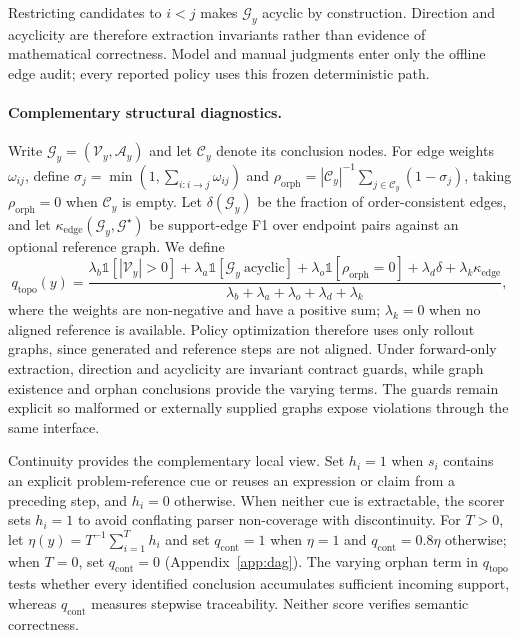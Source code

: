 Restricting candidates to $i<j$ makes $\mathcal{G}_y$ acyclic by construction. Direction and acyclicity are therefore extraction invariants rather than evidence of mathematical correctness. Model and manual judgments enter only the offline edge audit; every reported policy uses this frozen deterministic path.

\paragraph{Complementary structural diagnostics.}
Write $\mathcal{G}_y=(\mathcal{V}_y,\mathcal{A}_y)$ and let $\mathcal{C}_y$ denote its conclusion nodes. For edge weights $\omega_{ij}$, define $\sigma_j=\min(1,\sum_{i:i\to j}\omega_{ij})$ and $\rho_{\mathrm{orph}}=|\mathcal{C}_y|^{-1}\sum_{j\in\mathcal{C}_y}(1-\sigma_j)$, taking $\rho_{\mathrm{orph}}=0$ when $\mathcal{C}_y$ is empty. Let $\delta(\mathcal{G}_y)$ be the fraction of order-consistent edges, and let $\kappa_{\mathrm{edge}}(\mathcal{G}_y,\mathcal{G}^{\star})$ be support-edge F1 over endpoint pairs against an optional reference graph. We define
\begin{equation}
\label{eq:qtopo}
q_{\mathrm{topo}}(y)=
\frac{\lambda_b\mathbb{1}[|\mathcal{V}_y|>0]+\lambda_a\mathbb{1}[\mathcal{G}_y\ \mathrm{acyclic}]+\lambda_o\mathbb{1}[\rho_{\mathrm{orph}}=0]+\lambda_d\delta+\lambda_k\kappa_{\mathrm{edge}}}
{\lambda_b+\lambda_a+\lambda_o+\lambda_d+\lambda_k},
\end{equation}
where the weights are non-negative and have a positive sum; $\lambda_k=0$ when no aligned reference is available. Policy optimization therefore uses only rollout graphs, since generated and reference steps are not aligned. Under forward-only extraction, direction and acyclicity are invariant contract guards, while graph existence and orphan conclusions provide the varying terms. The guards remain explicit so malformed or externally supplied graphs expose violations through the same interface.

Continuity provides the complementary local view. Set $h_i=1$ when $s_i$ contains an explicit problem-reference cue or reuses an expression or claim from a preceding step, and $h_i=0$ otherwise. When neither cue is extractable, the scorer sets $h_i=1$ to avoid conflating parser non-coverage with discontinuity. For $T>0$, let $\eta(y)=T^{-1}\sum_{i=1}^{T}h_i$ and set $q_{\mathrm{cont}}=1$ when $\eta=1$ and $q_{\mathrm{cont}}=0.8\eta$ otherwise; when $T=0$, set $q_{\mathrm{cont}}=0$ (Appendix~\ref{app:dag}). The varying orphan term in $q_{\mathrm{topo}}$ tests whether every identified conclusion accumulates sufficient incoming support, whereas $q_{\mathrm{cont}}$ measures stepwise traceability. Neither score verifies semantic correctness.

